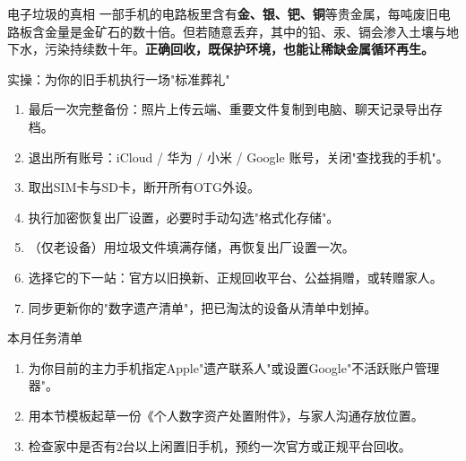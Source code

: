 \begin{tcbinfo}{电子垃圾的真相}
一部手机的电路板里含有\textbf{金、银、钯、铜}等贵金属，每吨废旧电路板含金量是金矿石的数十倍。但若随意丢弃，其中的铅、汞、镉会渗入土壤与地下水，污染持续数十年。\textbf{正确回收，既保护环境，也能让稀缺金属循环再生。}

\end{tcbinfo}

\begin{tcbpractice}{实操：为你的旧手机执行一场"标准葬礼"}
\begin{enumerate}
  \item 最后一次完整备份：照片上传云端、重要文件复制到电脑、聊天记录导出存档。
  \item 退出所有账号：iCloud / 华为 / 小米 / Google 账号，关闭"查找我的手机"。
  \item 取出SIM卡与SD卡，断开所有OTG外设。
  \item 执行加密恢复出厂设置，必要时手动勾选"格式化存储"。
  \item （仅老设备）用垃圾文件填满存储，再恢复出厂设置一次。
  \item 选择它的下一站：官方以旧换新、正规回收平台、公益捐赠，或转赠家人。
  \item 同步更新你的"数字遗产清单"，把已淘汰的设备从清单中划掉。
\end{enumerate}

\end{tcbpractice}

\begin{tcbpractice}{本月任务清单}
\begin{enumerate}
  \item 为你目前的主力手机指定Apple"遗产联系人"或设置Google"不活跃账户管理器"。
  \item 用本节模板起草一份《个人数字资产处置附件》，与家人沟通存放位置。
  \item 检查家中是否有2台以上闲置旧手机，预约一次官方或正规平台回收。
\end{enumerate}

\end{tcbpractice}
